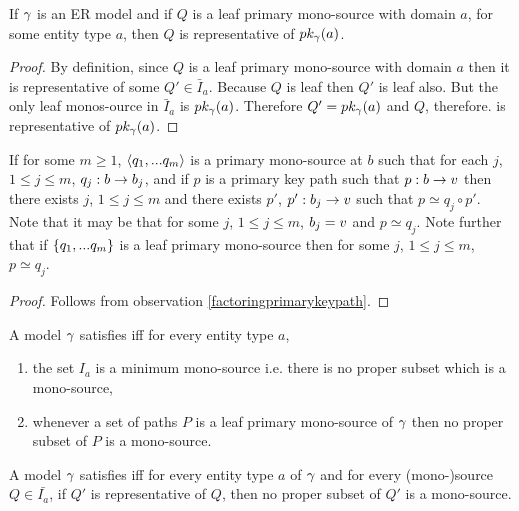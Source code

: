 \begin{lemma}
If $\gamma$ is an ER model and if $Q$ is a leaf primary mono-source with domain $a$, for some entity type $a$, then $Q$ is representative of $pk_{\gamma}(a)$.
\end{lemma}
\begin{proof}
By definition, since $Q$ is a leaf primary mono-source with domain $a$ then it is representative of some $Q' \in \bar{I}_a$. Because
$Q$ is leaf then $Q'$ is leaf also. But the only leaf monos-ource in $\bar{I}_a$ is $pk_{\gamma}(a)$. Therefore $Q'=pk_{\gamma}(a)$ and $Q$, therefore.
is representative of  $pk_{\gamma}(a)$.
\end{proof}


\begin{lemma}
If for some $m \geq 1$, $\langle q_1,...q_m\rangle$ is a primary mono-source at $b$ such that for each $j$, $1 \leq j \leq m$, $q_j : b \rightarrow b_j$,
and if  $p$ is a primary key path such that $p: b \rightarrow v$   
then there exists $j$, $1 \leq j \leq m$ and there exists $p'$, $p': b_j \rightarrow v$ such that $p \simeq q_j \circ p'$.
Note that it may be that for some $j$, $1 \leq j \leq m$, $b_j = v$ and $p \simeq q_j$.
Note further that if $\left\{q_1,...q_m\right\}$ is a leaf primary mono-source then for some $j$, $1 \leq j \leq m$, $p \simeq q_j$.
\end{lemma}
\begin{proof}
Follows from observation \ref{factoringprimarykeypath}.
\end{proof}

\begin{definition}
A model $\gamma$ satisfies  iff for every entity type $a$,
\begin{enumerate}
\item the set $I_a$ is a minimum mono-source i.e. there is no proper subset which is a mono-source,
\item whenever a set of paths $P$ is a leaf primary mono-source of $\gamma$ then no proper subset of $P$ is a mono-source.
\end{enumerate}
\end{definition}

\begin{conjecture}
A model $\gamma$ satisfies  iff 
for every entity type $a$ of $\gamma$ and for every (mono-)source $Q \in \bar{I_a}$, if $Q'$ is representative
of  $Q$, then no proper subset of $Q'$ is a mono-source. 
\end{conjecture}

